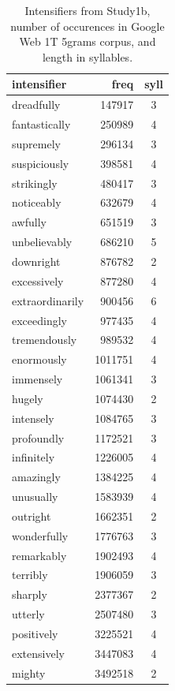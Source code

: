 \begin{table}[hbt]
 \begin{center}
 \footnotesize
  \caption{Intensifiers from Study1b, number of occurences in Google Web 1T 5grams corpus, and length in syllables.}
  \label{table:intensifiers_study1b}
  \begin{tabular}{lrc}
   \hline
   intensifier & freq & syll \\
   \hline
    dreadfully & 147917 & 3 \\ 
    fantastically & 250989 & 4 \\ 
    supremely & 296134 & 3 \\ 
    suspiciously & 398581 & 4 \\ 
    strikingly & 480417 & 3 \\ 
    noticeably & 632679 & 4 \\ 
    awfully & 651519 & 3 \\ 
    unbelievably & 686210 & 5 \\ 
    downright & 876782 & 2 \\ 
    excessively & 877280 & 4 \\ 
    extraordinarily & 900456 & 6 \\ 
    exceedingly & 977435 & 4 \\ 
    tremendously & 989532 & 4 \\ 
    enormously & 1011751 & 4 \\ 
    immensely & 1061341 & 3 \\ 
    hugely & 1074430 & 2 \\ 
    intensely & 1084765 & 3 \\ 
    profoundly & 1172521 & 3 \\ 
    infinitely & 1226005 & 4 \\ 
    amazingly & 1384225 & 4 \\ 
    unusually & 1583939 & 4 \\ 
    outright & 1662351 & 2 \\ 
    wonderfully & 1776763 & 3 \\ 
    remarkably & 1902493 & 4 \\ 
    terribly & 1906059 & 3 \\ 
    sharply & 2377367 & 2 \\ 
    utterly & 2507480 & 3 \\ 
    positively & 3225521 & 4 \\ 
    extensively & 3447083 & 4 \\ 
    mighty & 3492518 & 2 \\ 

\end{tabular}
\end{center}
\end{table}
